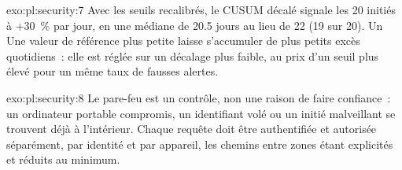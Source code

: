 \begin{solution}{exo:pl:security:7}
Avec les seuils recalibrés, le CUSUM décalé signale les 20 initiés à +30~\% par jour, en une médiane de 20.5 jours au lieu de 22 (19 sur 20). Un
Une valeur de référence plus petite laisse s'accumuler de plus petits excès quotidiens~: elle est réglée sur un décalage plus faible, au prix d'un seuil
plus élevé pour un même taux de fausses alertes.
\end{solution}

\begin{solution}{exo:pl:security:8}
Le pare-feu est un contrôle, non une raison de faire confiance~: un ordinateur portable compromis, un identifiant volé ou un initié malveillant se trouvent déjà à l'intérieur. Chaque
requête doit être authentifiée et autorisée séparément, par identité et par appareil, les chemins entre zones étant explicités et réduits au minimum.
\end{solution}

